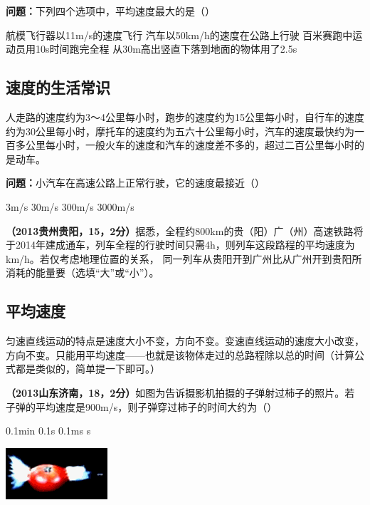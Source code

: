 \documentclass[12pt,twoside]{exam}
\begin{document}
\begin{knowledge}
\textbf{问题：}下列四个选项中，平均速度最大的是（\answerline*[B]）
\begin{choices}
\choice 航模飞行器以11m/s的速度飞行 
\choice 汽车以50km/h的速度在公路上行驶
\choice 百米赛跑中运动员用10s时间跑完全程
\choice 从30m高出竖直下落到地面的物体用了2.5s
\end{choices}

\subsection{速度的生活常识}
人走路的速度约为3～4公里每小时，跑步的速度约为15公里每小时，自行车的速度约为30公里每小时，摩托车的速度约为五六十公里每小时，汽车的速度最快约为一百多公里每小时，一般火车的速度和汽车的速度差不多的，超过二百公里每小时的是动车。


\textbf{问题：}小汽车在高速公路上正常行驶，它的速度最接近（\answerline*[B]）

\begin{oneparchoices}
\choice 3m/s
\choice 30m/s
\choice 300m/s
\choice 3000m/s
\end{oneparchoices}

\textbf{（2013贵州贵阳，15，2分）}据悉，全程约800km的贵（阳）广（州）高速铁路将于2014年建成通车，列车全程的行驶时间只需4h，则列车这段路程的平均速度为\answerline*[200]km/h。若仅考虑地理位置的关系， 同一列车从贵阳开到广州比从广州开到贵阳所消耗的能量要\answerline*[小]（选填“大”或“小”）。



\subsection{平均速度}
匀速直线运动的特点是速度大小不变，方向不变。变速直线运动的速度大小改变，方向不变。只能用平均速度——也就是该物体走过的总路程除以总的时间（计算公式都是类似的，简单提一下即可。）

\textbf{（2013山东济南，18，2分）}如图为告诉摄影机拍摄的子弹射过柿子的照片。若子弹的平均速度是900m/s，则子弹穿过柿子的时间大约为（\answerline*[C]）

\begin{multicols}{2}
\begin{choices}
\choice 0.1min
\choice 0.1s
\choice 0.1ms
\si{\micro}s
\end{choices}
\columnbreak
\includegraphics[scale=1]{figures/子弹穿过柿子.png} 
\end{multicols}


\end{knowledge}
\end{document}
